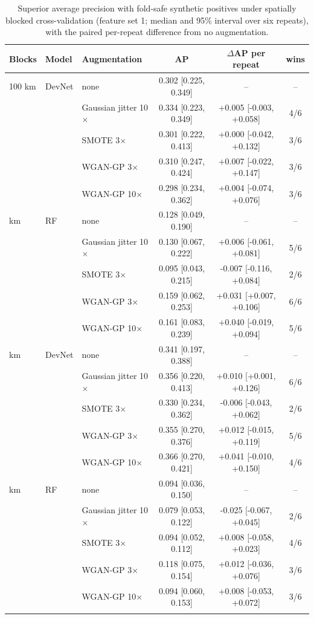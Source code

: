 \documentclass[pdflatex,sn-apa]{sn-jnl}
\begin{document}
\begin{appendices}
\begin{table}[!h]
\caption{Superior average precision with fold-safe synthetic positives under spatially blocked cross-validation (feature set 1; median and 95\% interval over six repeats), with the paired per-repeat difference from no augmentation.}\label{tab:aug-spatial}
\footnotesize
\begin{tabular*}{\textwidth}{@{\extracolsep\fill}lllccc}
\toprule
Blocks & Model & Augmentation & AP & $\Delta$AP per repeat & wins \\
\midrule
100 km & DevNet & none & 0.302 [0.225, 0.349] & -- & -- \\
 &  & Gaussian jitter 10$\times$ & 0.334 [0.223, 0.349] & +0.005 [-0.003, +0.058] & 4/6 \\
 &  & SMOTE 3$\times$ & 0.301 [0.222, 0.413] & +0.000 [-0.042, +0.132] & 3/6 \\
 &  & WGAN-GP 3$\times$ & 0.310 [0.247, 0.424] & +0.007 [-0.022, +0.147] & 3/6 \\
 &  & WGAN-GP 10$\times$ & 0.298 [0.234, 0.362] & +0.004 [-0.074, +0.076] & 3/6 \\
\addlinespace
100 km & RF & none & 0.128 [0.049, 0.190] & -- & -- \\
 &  & Gaussian jitter 10$\times$ & 0.130 [0.067, 0.222] & +0.006 [-0.061, +0.081] & 5/6 \\
 &  & SMOTE 3$\times$ & 0.095 [0.043, 0.215] & -0.007 [-0.116, +0.084] & 2/6 \\
 &  & WGAN-GP 3$\times$ & 0.159 [0.062, 0.253] & +0.031 [+0.007, +0.106] & 6/6 \\
 &  & WGAN-GP 10$\times$ & 0.161 [0.083, 0.239] & +0.040 [-0.019, +0.094] & 5/6 \\
\addlinespace
200 km & DevNet & none & 0.341 [0.197, 0.388] & -- & -- \\
 &  & Gaussian jitter 10$\times$ & 0.356 [0.220, 0.413] & +0.010 [+0.001, +0.126] & 6/6 \\
 &  & SMOTE 3$\times$ & 0.330 [0.234, 0.362] & -0.006 [-0.043, +0.062] & 2/6 \\
 &  & WGAN-GP 3$\times$ & 0.355 [0.270, 0.376] & +0.012 [-0.015, +0.119] & 5/6 \\
 &  & WGAN-GP 10$\times$ & 0.366 [0.270, 0.421] & +0.041 [-0.010, +0.150] & 4/6 \\
\addlinespace
200 km & RF & none & 0.094 [0.036, 0.150] & -- & -- \\
 &  & Gaussian jitter 10$\times$ & 0.079 [0.053, 0.122] & -0.025 [-0.067, +0.045] & 2/6 \\
 &  & SMOTE 3$\times$ & 0.094 [0.052, 0.112] & +0.008 [-0.058, +0.023] & 4/6 \\
 &  & WGAN-GP 3$\times$ & 0.118 [0.075, 0.154] & +0.012 [-0.036, +0.076] & 3/6 \\
 &  & WGAN-GP 10$\times$ & 0.094 [0.060, 0.153] & +0.008 [-0.053, +0.072] & 3/6 \\
\botrule
\end{tabular*}
\end{table}


\end{appendices}
\end{document}
